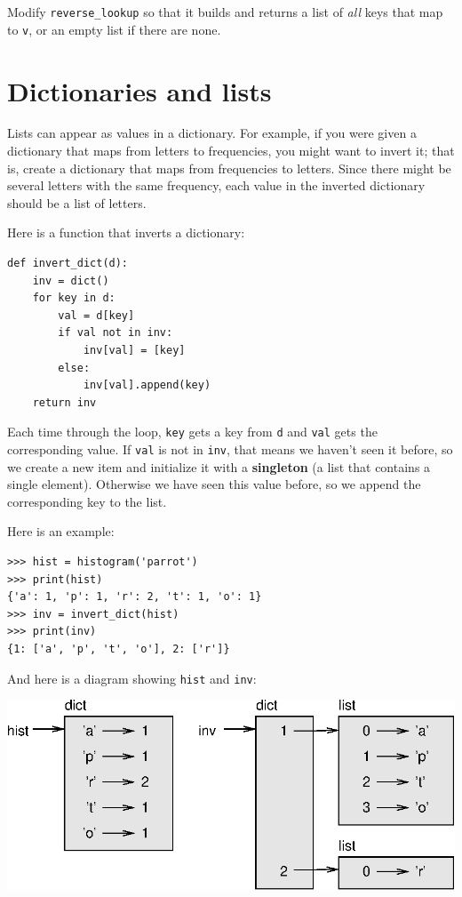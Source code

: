 \documentclass[10pt]{book}
\begin{document}
\begin{ex}
Modify \verb"reverse_lookup" so that it builds and returns a list
of {\em all} keys that map to {\tt v}, or an empty list if there
are none.
\end{ex}


\section{Dictionaries and lists}

Lists can appear as values in a dictionary.  For example, if you
were given a dictionary that maps from letters to frequencies, you
might want to invert it; that is, create a dictionary that maps
from frequencies to letters.  Since there might be several letters
with the same frequency, each value in the inverted dictionary
should be a list of letters.


Here is a function that inverts a dictionary:

\beforeverb
\begin{verbatim}
def invert_dict(d):
    inv = dict()
    for key in d:
        val = d[key]
        if val not in inv:
            inv[val] = [key]
        else:
            inv[val].append(key)
    return inv
\end{verbatim}
\afterverb
%
Each time through the loop, {\tt key} gets a key from {\tt d} and 
{\tt val} gets the corresponding value.  If {\tt val} is not in {\tt inv},
that means we haven't seen it before, so we create a new item and
initialize it with a {\bf singleton} (a list that contains a
single element).  Otherwise we have seen this value before, so we
append the corresponding key to the list.


Here is an example:

\beforeverb
\begin{verbatim}
>>> hist = histogram('parrot')
>>> print(hist)
{'a': 1, 'p': 1, 'r': 2, 't': 1, 'o': 1}
>>> inv = invert_dict(hist)
>>> print(inv)
{1: ['a', 'p', 't', 'o'], 2: ['r']}
\end{verbatim}
\afterverb
%
And here is a diagram showing {\tt hist} and {\tt inv}:


\beforefig
\centerline{\includegraphics{figs/dict1.eps}}
\afterfig
\end{document}
